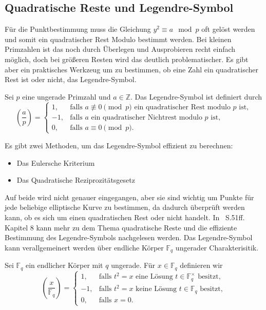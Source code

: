 \subsection{Quadratische Reste und Legendre-Symbol}
Für die Punktbestimmung muss die Gleichung $y^2\equiv a\mod p$ oft gelöst werden und somit ein quadratischer Rest Modulo bestimmt werden. Bei kleinen Primzahlen ist das noch durch Überlegen und Ausprobieren recht einfach möglich, doch bei größeren Resten wird das deutlich problematischer. Es gibt aber ein praktisches Werkzeug um zu bestimmen, ob eine Zahl ein quadratischer Rest ist oder nicht, das Legendre-Symbol.
\begin{definition}
    Sei \(p\) eine ungerade Primzahl und \(a\in\mathbb Z\). Das Legendre-Symbol ist definiert durch
    \[
        \left(\frac{a}{p}\right)
        =
        \begin{cases}
            1,  & \text{falls } a \not\equiv 0 \pmod p \text{ ein quadratischer Rest modulo } p \text{ ist}, \\
            -1, & \text{falls } a \text{ ein quadratischer Nichtrest modulo } p \text{ ist},                 \\
            0,  & \text{falls } a \equiv 0 \pmod p.
        \end{cases}
    \]
\end{definition}
Es gibt zwei Methoden, um das Legendre-Symbol effizient zu berechnen:
\begin{itemize}
    \item Das Eulersche Kriterium
    \item Das Quadratische Reziprozitätsgesetz
\end{itemize}
Auf beide wird nicht genauer eingegangen, aber sie sind wichtig um Punkte für jede beliebige elliptische Kurve zu bestimmen, da dadurch überprüft werden kann, ob es sich um einen quadratischen Rest oder nicht handelt. In~\cite{muller} S.51ff. Kapitel 8 kann mehr zu dem Thema quadratische Reste und die effiziente Bestimmung des Legendre-Symbols nachgelesen werden. Das Legendre-Symbol kann verallgemeinert werden über endliche Körper $\mathbb{F}_q$ ungerader Charakterisitik.
\begin{definition}
    Sei \(\mathbb F_q\) ein endlicher Körper mit \(q\) ungerade. Für \(x\in\mathbb F_q\) definieren wir
    \[
        \left(\frac{x}{\mathbb F_q}\right)
        =
        \begin{cases}
            1,  & \text{falls } t^2=x \text{ eine Lösung } t\in\mathbb F_q^\times \text{ besitzt}, \\
            -1, & \text{falls } t^2=x \text{ keine Lösung } t\in\mathbb F_q \text{ besitzt},       \\
            0,  & \text{falls } x=0.
        \end{cases}
    \]

\end{definition}
